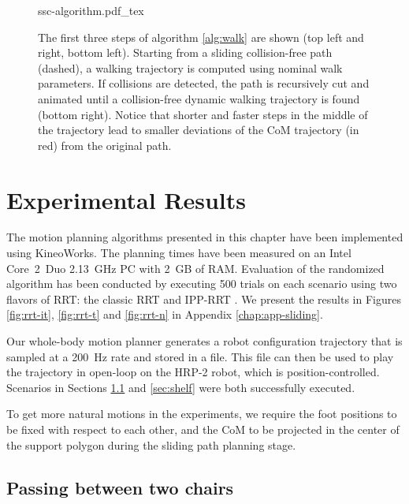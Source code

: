 \begin{figure}
  \centering
      {\def\svgwidth{\linewidth}
        {\footnotesize
          
                     {ssc-algorithm.pdf_tex}}
      }
      \caption{The first three steps of algorithm \ref{alg:walk} are
        shown (top left and right, bottom left). Starting from a
        sliding collision-free path (dashed), a walking trajectory is
        computed using nominal walk parameters. If collisions are
        detected, the path is recursively cut and animated until a
        collision-free dynamic walking trajectory is found (bottom
        right). Notice that shorter and faster steps in the middle of
        the trajectory lead to smaller deviations of the CoM
        trajectory (in red) from the original path.}
      \label{fig:chap2-ssc-algorithm}
\end{figure}

\section{Experimental Results}

\label{sec:exp}

The motion planning algorithms presented in this chapter have been
implemented using KineoWorks\texttrademark \cite{laumond2006kcs}. The
planning times have been measured on an Intel Core~2~Duo 2.13~GHz PC
with 2~GB of RAM. Evaluation of the randomized algorithm has been
conducted by executing 500 trials on each scenario using two flavors
of RRT: the classic RRT and IPP-RRT \cite{FERR04A}. We present the
results in Figures \ref{fig:rrt-it}, \ref{fig:rrt-t} and \ref{fig:rrt-n}
in Appendix \ref{chap:app-sliding}.

Our whole-body motion planner generates a robot configuration
trajectory that is sampled at a 200~Hz rate and stored in a file. This
file can then be used to play the trajectory in open-loop on the HRP-2
robot, which is position-controlled. Scenarios in Sections
\ref{sec:chairs} and \ref{sec:shelf} were both successfully executed.

To get more natural motions in the experiments, we require the foot
positions to be fixed with respect to each other, and the CoM to be
projected in the center of the support polygon during the sliding path
planning stage.

\subsection{Passing between two chairs}
\label{sec:chairs}

